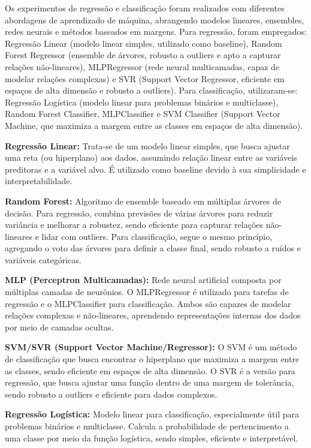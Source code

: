 Os experimentos de regressão e classificação foram realizados com diferentes abordagens de aprendizado de máquina, abrangendo modelos lineares, ensembles, redes neurais e métodos baseados em margens. Para regressão, foram empregados: Regressão Linear (modelo linear simples, utilizado como baseline)\cite{silva2016}, Random Forest Regressor (ensemble de árvores, robusto a outliers e apto a capturar relações não-lineares)\cite{breiman2001}, MLPRegressor (rede neural multicamadas, capaz de modelar relações complexas)\cite{haykin2009} e SVR (Support Vector Regressor, eficiente em espaços de alta dimensão e robusto a outliers)\cite{cortes1995}. Para classificação, utilizaram-se: Regressão Logística (modelo linear para problemas binários e multiclasse)\cite{hosmer2013,gonzalez2018}, Random Forest Classifier\cite{breiman2001}, MLPClassifier\cite{haykin2009} e SVM Classifier (Support Vector Machine, que maximiza a margem entre as classes em espaços de alta dimensão)\cite{cortes1995}.

\textbf{Regressão Linear:} Trata-se de um modelo linear simples, que busca ajustar uma reta (ou hiperplano) aos dados, assumindo relação linear entre as variáveis preditoras e a variável alvo. É utilizado como baseline devido à sua simplicidade e interpretabilidade.

\textbf{Random Forest:} Algoritmo de ensemble baseado em múltiplas árvores de decisão. Para regressão, combina previsões de várias árvores para reduzir variância e melhorar a robustez, sendo eficiente para capturar relações não-lineares e lidar com outliers. Para classificação, segue o mesmo princípio, agregando o voto das árvores para definir a classe final, sendo robusto a ruídos e variáveis categóricas.

\textbf{MLP (Perceptron Multicamadas):} Rede neural artificial composta por múltiplas camadas de neurônios. O MLPRegressor é utilizado para tarefas de regressão e o MLPClassifier para classificação. Ambos são capazes de modelar relações complexas e não-lineares, aprendendo representações internas dos dados por meio de camadas ocultas.

\textbf{SVM/SVR (Support Vector Machine/Regressor):} O SVM é um método de classificação que busca encontrar o hiperplano que maximiza a margem entre as classes, sendo eficiente em espaços de alta dimensão. O SVR é a versão para regressão, que busca ajustar uma função dentro de uma margem de tolerância, sendo robusto a outliers e eficiente para dados complexos.

\textbf{Regressão Logística:} Modelo linear para classificação, especialmente útil para problemas binários e multiclasse. Calcula a probabilidade de pertencimento a uma classe por meio da função logística, sendo simples, eficiente e interpretável.

